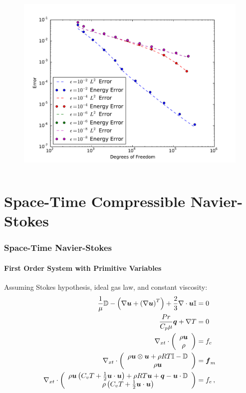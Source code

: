 \documentclass[18pt,xcolor=table]{beamer}
\begin{document}
\begin{frame}[t]
\begin{columns}[t]
\begin{column}{0.5\textwidth}
\begin{figure}[t]
\includegraphics[width=\textwidth]{SpaceTimeAnalyticalNorm4}
\end{figure}
\end{column}
\end{columns}
\end{frame}



\section{Space-Time Compressible Navier-Stokes}
\begin{frame}[t]
\frametitle{Space-Time Navier-Stokes}
\framesubtitle{First Order System with Primitive Variables}
Assuming Stokes hypothesis, ideal gas law, and constant viscosity:
\begin{align*}
  \frac{1}{\mu}\mathbb{D}-\left( \nabla\boldsymbol u+\left( \nabla\boldsymbol u \right)^T \right)+\frac{2}{3}\nabla\cdot\boldsymbol u\mathbb{I}&=0\\
  \frac{Pr}{C_p\mu}\boldsymbol q+\nabla T&=0\\
  \nabla_{xt}\cdot\left( \begin{array}{c} \rho\boldsymbol u\\ \rho\\ \end{array} \right)&=f_c\\
  \nabla_{xt}\cdot\left( \begin{array}{c} \rho\boldsymbol u\otimes\boldsymbol u+\rho RT\mathbb{I}-\mathbb{D}\\ \rho\boldsymbol u\\ \end{array} \right)&=\boldsymbol f_m\\
  \nabla_{xt}\cdot\left( \begin{array}{c} \rho\boldsymbol u\left( C_v T+\frac{1}{2}\boldsymbol u\cdot\boldsymbol u \right)+\rho RT\boldsymbol u+\boldsymbol q-\boldsymbol u\cdot\mathbb{D}\\ \rho\left( C_v T+\frac{1}{2}\boldsymbol u\cdot\boldsymbol u \right)\\ \end{array} \right)&=f_e\,,
\end{align*}
\end{frame}
\end{document}
